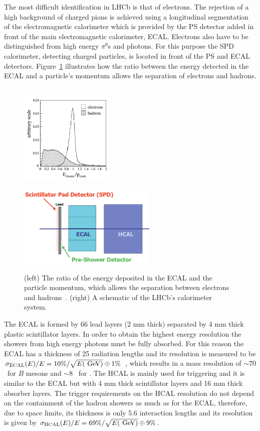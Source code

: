 The most difficult identification in LHCb is that of electrons. The rejection of a high background of charged pions
is achieved using a longitudinal segmentation of the electromagnetic calorimeter which is provided by
the PS detector added in front of the main electromagnetic calorimeter, ECAL. Electrons also have to be 
distinguished from high energy $\pi^0$s and photons. For this purpose the SPD calorimeter, detecting charged particles,
is located in front of the PS and ECAL detectors. Figure~\ref{fig:pi0_e_pid_perf} illustrates how the ratio between the
energy detected in the ECAL and a particle's momentum allows the separation of electrons and hadrons.

\begin{figure}[t!]
\centering
\includegraphics[width=0.4\textwidth,height=5.3cm]{Detector/figs/pi0_e_pid_perf.png}
\includegraphics[width=0.59\textwidth]{Detector/figs/calo_layout.png}
\caption{(left) The ratio of the energy deposited in the ECAL and the particle momentum, which allows
the separation between electrons and hadrons~\cite{Alves:2008zz}. (right) A schematic of the LHCb's calorimeter system. }
\label{fig:pi0_e_pid_perf}
\end{figure}

The ECAL is formed by 66 lead layers (2 mm thick) separated by 4 mm thick plastic scintillator layers.
In order to obtain the highest energy resolution the showers from high energy photons 
must be fully absorbed. For this reason the ECAL has a thickness of 25 radiation lengths and its resolution is 
measured to be $\sigma_{\rm ECAL}(E) / E = 10\% / \sqrt{E(\gev )} \oplus 1\%$~\cite{Alves:2008zz},
which results in a mass resolution of $\sim 70$ \mevcc~for $B$ mesons and $\sim 8$ \mevcc~for \piz.
The HCAL is mainly used for triggering and it is similar to the ECAL but with 4 mm thick scintillator layers and 
16 mm thick absorber layers. The trigger requirements on the HCAL resolution do not depend on the containment of the hadron showers
as much as for the ECAL, therefore, due to space limits, its thickness is only 5.6 interaction lengths and its resolution is given by
 $\sigma_{\rm HCAL}(E) / E = 69\%/\sqrt{E(\gev )} \oplus 9\%$.

